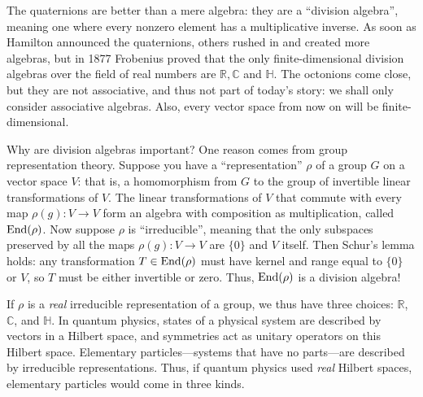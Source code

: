 \documentclass[]{amsart}
\newcommand{\maps}{\colon}    %
\newcommand{\R}{{\mathbb R}}  %
\newcommand{\C}{{\mathbb C}}  %
\renewcommand{\H}{{\mathbb H}}  %
\newcommand{\End}{{\rm End}}
\theoremstyle{definition}
\begin{document}

The quaternions are better than a mere algebra: they are a ``division algebra'', meaning one where every nonzero element has a multiplicative inverse.     As soon as Hamilton announced the quaternions, others rushed in and created more algebras, but in 1877 Frobenius proved that the only finite-dimensional division algebras over the field of real numbers are $\R, \C$ and $\H$.   The octonions come close, but they are not associative, and thus not part of today's story: we shall only consider associative algebras.  Also, every vector space from now on will be finite-dimensional.

Why are division algebras important?   One reason comes from group representation theory. 
Suppose you have a ``representation'' $\rho$ of a group $G$ on a vector space $V$: that is, a
homomorphism from $G$ to the group of invertible linear transformations of $V$.  
The linear transformations of $V$ that commute with every map $\rho(g) \maps V \to V$ 
form an algebra with composition as multiplication, called $\End(\rho)$.  Now suppose $\rho$ is ``irreducible'', meaning that the only subspaces preserved by all the maps $\rho(g) \maps V \to V$  are $\{0\}$ and $V$ itself.    Then Schur's lemma holds: any transformation $T \in \End(\rho)$ must have kernel and range equal to $\{0\}$ or $V$, so $T$ must be either invertible or zero. Thus, 
$\End(\rho)$ is a division algebra!

If $\rho$ is a \emph{real} irreducible representation of a group, we thus have three choices: 
$\R$, $\C$, and $\H$.    In quantum physics, states of a physical system are described by 
vectors in a Hilbert space, and symmetries act as unitary operators on this Hilbert space.
Elementary particles---systems that have no parts---are described by irreducible representations.   Thus, if quantum physics used \emph{real} Hilbert spaces, elementary particles would come in three kinds.
\end{document}

